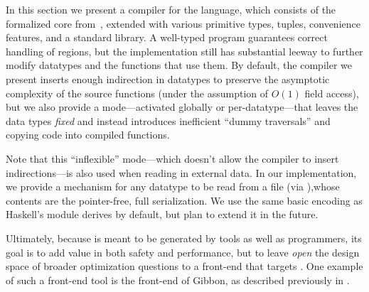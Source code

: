 In this section we present a compiler for the \ourcalc language, which consists of
the formalized core from~, extended with various primitive types, tuples,
convenience features, and a standard library.
%
A well-typed \ourcalc program guarantees correct handling of regions, but the
implementation still has substantial leeway to further modify datatypes and
the functions that use them.
%
By default, the compiler we present inserts enough indirection in
datatypes to preserve the asymptotic complexity of the source functions (under
the assumption of $O(1)$ field access), but we also provide a mode---activated
globally or per-datatype---that leaves the data types
\emph{fixed} and instead introduces inefficient ``dummy traversals'' and copying
code into compiled functions.
%
%

{Note that this ``inflexible'' mode---which doesn't allow the compiler to
  insert indirections---is also used when reading in external data.  In our
  \ourcalc implementation, we provide a mechanism for any datatype to be read
  from a file (via ),whose contents are the pointer-free, full
  serialization.  We use the same basic encoding as Haskell's
   module derives by default, but plan to extend it in the
  future.}

Ultimately, because \ourcalc is meant to be generated by tools as well as programmers,
its goal is to add value in both safety and performance, but to leave
\emph{open} the design space of broader optimization questions to a front-end that
targets \ourcalc{}. One example of such a front-end tool is the front-end of
Gibbon, as described previously in .

